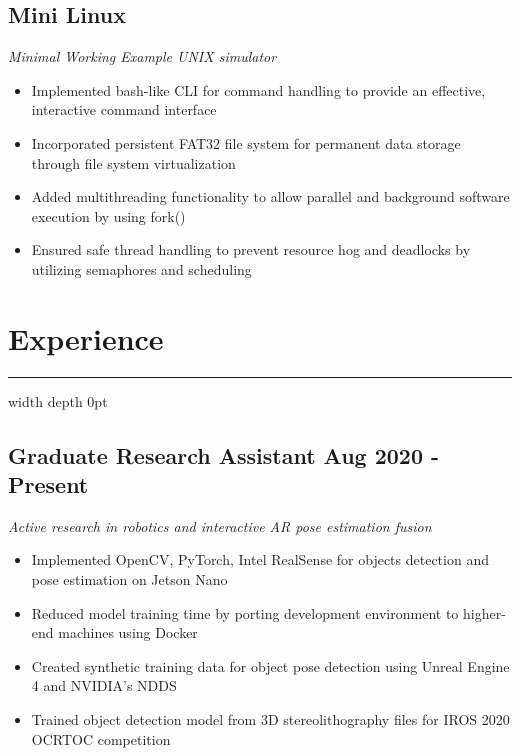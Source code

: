 \documentclass[11pt]{article}
\begin{document}
        \subsection*{Mini Linux}
            \vspace{-0.2cm}
            \textit{Minimal Working Example UNIX simulator}
            \vspace{-0.1cm}
            \begin{itemize}[noitemsep]
                \item Implemented bash-like CLI for command handling to provide an effective, interactive command interface
                \item Incorporated persistent FAT32 file system for permanent data storage through file system virtualization
                \item Added multithreading functionality to allow parallel and background software execution by
                using fork()
                \item Ensured safe thread handling to prevent resource hog and deadlocks by utilizing
                semaphores and scheduling
            \end{itemize}
    \section*{Experience}
        \hrule height 0.5pt width \textwidth depth 0pt \relax
        \vspace{0.1cm}

        \subsection*{Graduate Research Assistant \hfill Aug 2020 - Present} 
        \vspace{-0.2cm}
        \textit{Active research in robotics and interactive AR pose estimation fusion}
        \vspace{-0.1cm}
        \begin{itemize}[noitemsep]
            \item Implemented OpenCV, PyTorch, Intel RealSense for objects detection and pose estimation on Jetson Nano
            \item Reduced model training time by porting development environment to higher-end machines
            using Docker
            \item Created synthetic training data for object pose detection using Unreal Engine 4 and
            NVIDIA's NDDS
            \item Trained object detection model from 3D stereolithography files for IROS 2020 OCRTOC competition 
        
        \end{itemize}
\end{document}
